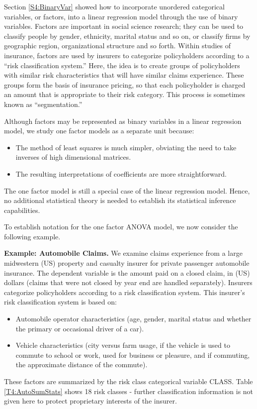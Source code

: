 Section \ref{S4:BinaryVar} showed how to incorporate unordered
categorical variables, or factors, into a linear regression model
through the use of binary variables. Factors are important in social
science research; they can be used to classify people by gender,
ethnicity, marital status and so on, or classify firms by geographic
region, organizational structure and so forth. Within studies of
insurance, factors are used by insurers to categorize policyholders
according to a ``risk classification system.'' Here, the idea is to
create groups of policyholders with similar risk characteristics
that will have similar claims experience. These groups form the
basis of insurance pricing, so that each policyholder is
charged an amount that is appropriate to their risk category. This
process is sometimes known as ``segmentation.''

Although factors may be represented as binary variables in a linear
regression model, we study one factor models as a separate unit
because:
\begin{itemize}
\item The method of least squares is much simpler, obviating the need to take inverses of high dimensional matrices.
\item The resulting interpretations of coefficients are more straightforward.
\end{itemize}
The one factor model is still a special case of the linear
regression model. Hence, no additional statistical theory is needed
to establish its statistical inference capabilities.

To establish notation for the one factor ANOVA model, we now
consider the following example.

\linejed



\textbf{Example: Automobile Claims.}
We examine claims experience from a large midwestern (US) property
and casualty insurer for private passenger automobile insurance.
The dependent variable is the amount paid on a closed claim, in (US)
dollars (claims that were not closed by year end are handled
separately). Insurers categorize policyholders according to a risk
classification system. This insurer's risk classification system is
based on:
\begin{itemize}
\item Automobile operator characteristics (age, gender, marital
  status and whether the primary or occasional driver of a car).
\item Vehicle characteristics (city versus farm usage, if the vehicle is used to commute to school or
    work, used for business or pleasure, and if commuting, the
    approximate distance of the commute).
\end{itemize}
These factors are summarized by the risk class categorical variable
CLASS. Table \ref{T4:AutoSumStats} shows 18 risk classes - further
classification information is not given here to protect proprietary
interests of the insurer.

